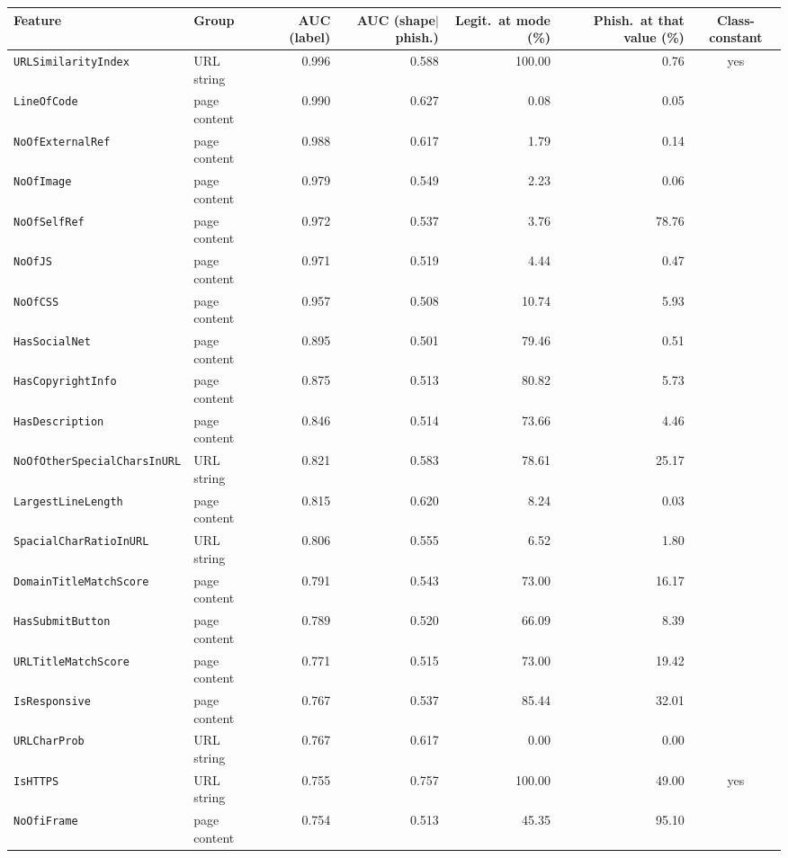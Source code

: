 \begin{tabular}{@{}llrrrrc@{}}
\toprule
\textbf{Feature} & \textbf{Group} & \textbf{AUC (label)} & \textbf{AUC (shape$|$phish.)} & \textbf{Legit.\ at mode (\%)} & \textbf{Phish.\ at that value (\%)} & \textbf{Class-constant}\\
\midrule
\texttt{URLSimilarityIndex} & URL string & 0.996 & 0.588 & 100.00 & 0.76 & yes\\
\texttt{LineOfCode} & page content & 0.990 & 0.627 & 0.08 & 0.05 & \\
\texttt{NoOfExternalRef} & page content & 0.988 & 0.617 & 1.79 & 0.14 & \\
\texttt{NoOfImage} & page content & 0.979 & 0.549 & 2.23 & 0.06 & \\
\texttt{NoOfSelfRef} & page content & 0.972 & 0.537 & 3.76 & 78.76 & \\
\texttt{NoOfJS} & page content & 0.971 & 0.519 & 4.44 & 0.47 & \\
\texttt{NoOfCSS} & page content & 0.957 & 0.508 & 10.74 & 5.93 & \\
\texttt{HasSocialNet} & page content & 0.895 & 0.501 & 79.46 & 0.51 & \\
\texttt{HasCopyrightInfo} & page content & 0.875 & 0.513 & 80.82 & 5.73 & \\
\texttt{HasDescription} & page content & 0.846 & 0.514 & 73.66 & 4.46 & \\
\texttt{NoOfOtherSpecialCharsInURL} & URL string & 0.821 & 0.583 & 78.61 & 25.17 & \\
\texttt{LargestLineLength} & page content & 0.815 & 0.620 & 8.24 & 0.03 & \\
\texttt{SpacialCharRatioInURL} & URL string & 0.806 & 0.555 & 6.52 & 1.80 & \\
\texttt{DomainTitleMatchScore} & page content & 0.791 & 0.543 & 73.00 & 16.17 & \\
\texttt{HasSubmitButton} & page content & 0.789 & 0.520 & 66.09 & 8.39 & \\
\texttt{URLTitleMatchScore} & page content & 0.771 & 0.515 & 73.00 & 19.42 & \\
\texttt{IsResponsive} & page content & 0.767 & 0.537 & 85.44 & 32.01 & \\
\texttt{URLCharProb} & URL string & 0.767 & 0.617 & 0.00 & 0.00 & \\
\texttt{IsHTTPS} & URL string & 0.755 & 0.757 & 100.00 & 49.00 & yes\\
\texttt{NoOfiFrame} & page content & 0.754 & 0.513 & 45.35 & 95.10 & \\

\end{tabular}
